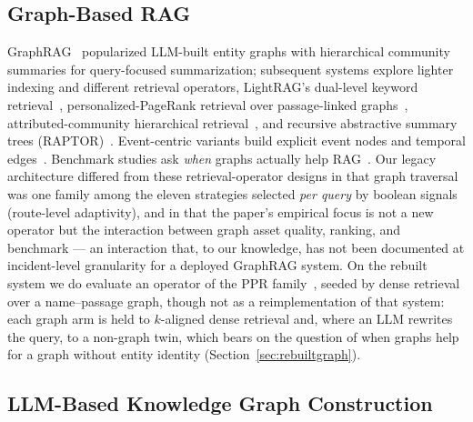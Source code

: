 \subsection{Graph-Based RAG}

GraphRAG~\cite{edge2024graphrag} popularized LLM-built entity graphs with
hierarchical community summaries for query-focused summarization;
subsequent systems explore lighter indexing and different retrieval
operators, \eg LightRAG's dual-level keyword retrieval~\cite{guo2024lightrag},
personalized-PageRank retrieval over passage-linked
graphs~\cite{gutierrez2025hipporag2}, attributed-community hierarchical
retrieval~\cite{wang2025archrag}, and recursive abstractive summary trees
(RAPTOR)~\cite{sarthi2024raptor}. Event-centric variants build explicit
event nodes and temporal edges~\cite{zhang2025entityevent,sun2025dygrag}.
Benchmark studies ask \emph{when} graphs actually help
RAG~\cite{xiang2025whengraphs}. Our legacy architecture differed from
these retrieval-operator designs in that graph traversal was one family
among the eleven strategies selected \emph{per query} by boolean signals
(route-level
adaptivity), and in that the paper's empirical focus is not a new
operator but the interaction between graph asset quality, ranking, and
benchmark --- an interaction that, to our knowledge, has not been
documented at incident-level granularity for a deployed GraphRAG system.
On the rebuilt system we do evaluate an operator of the PPR
family~\cite{gutierrez2025hipporag2}, seeded by dense retrieval over a
name--passage graph, though not as a reimplementation of that system:
each graph arm is held to $k$-aligned dense retrieval and, where an LLM rewrites the query, to a non-graph twin, which bears on the question of when graphs help~\cite{xiang2025whengraphs}
for a graph without entity identity (Section~\ref{sec:rebuiltgraph}).

\subsection{LLM-Based Knowledge Graph Construction}

